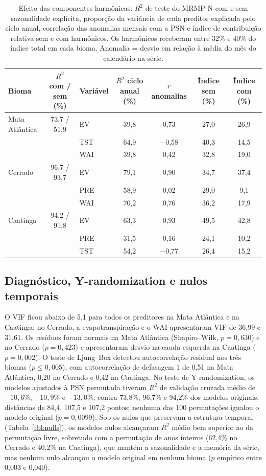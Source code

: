 \documentclass[a4paper,fleqn]{cas-dc}
\begin{document}
\begin{table}[htbp]
\caption{Efeito das componentes harmônicas: $R^2$ de teste do MRMP-N com e sem sazonalidade explícita, proporção da variância de cada preditor explicada pelo ciclo anual, correlação das anomalias mensais com a PSN e índice de contribuição relativa sem e com harmônicos. Os harmônicos receberam entre 32\% e 40\% do índice total em cada bioma. Anomalia = desvio em relação à média do mês do calendário na série.}\label{tbl:harm}
\scriptsize
\begin{tabular*}{\tblwidth}{@{}LCLCCCC@{}}
\toprule
Bioma & $R^2$ com / sem (\%) & Variável & $R^2$ ciclo anual (\%) & $r$ anomalias & Índice sem (\%) & Índice com (\%) \\
\midrule
Mata Atlântica & 73,7 / 51,9 & EV & 39,8 & 0,73 & 27,0 & 26,9 \\
 & & TST & 64,9 & $-$0,58 & 40,3 & 14,5 \\
 & & WAI & 39,8 & 0,42 & 32,8 & 19,0 \\
Cerrado & 96,7 / 93,7 & EV & 79,1 & 0,90 & 34,7 & 37,4 \\
 & & PRE & 58,9 & 0,02 & 29,0 & 9,1 \\
 & & WAI & 70,2 & 0,76 & 36,2 & 17,9 \\
Caatinga & 94,2 / 91,8 & EV & 63,3 & 0,93 & 49,5 & 42,8 \\
 & & PRE & 31,5 & 0,16 & 24,1 & 10,2 \\
 & & TST & 54,2 & $-$0,77 & 26,4 & 15,2 \\
\bottomrule
\end{tabular*}
\end{table}

\subsection{Diagnóstico, Y-randomization e nulos temporais}

O VIF ficou abaixo de 5,1 para todos os preditores na Mata Atlântica e na Caatinga; no Cerrado, a evapotranspiração e o WAI apresentaram VIF de 36,99 e 31,61. Os resíduos foram normais na Mata Atlântica (Shapiro--Wilk, $p = 0,630$) e no Cerrado ($p = 0,423$) e apresentaram desvio na cauda esquerda na Caatinga ($p = 0,002$). O teste de Ljung--Box detectou autocorrelação residual nos três biomas ($p \le 0,005$), com autocorrelação de defasagem 1 de 0,51 na Mata Atlântica, 0,20 no Cerrado e 0,42 na Caatinga. No teste de Y-randomization, os modelos ajustados à PSN permutada tiveram $R^2$ de validação cruzada médio de $-10,6\%$, $-10,9\%$ e $-13,0\%$, contra 73,8\%, 96,7\% e 94,2\% dos modelos originais, distâncias de 84,4, 107,5 e 107,2 pontos; nenhuma das 100 permutações igualou o modelo original ($p = 0,0099$). Sob os nulos que preservam a estrutura temporal (Tabela~\ref{tbl:nulls}), os modelos nulos alcançaram $R^2$ médio bem superior ao da permutação livre, sobretudo com a permutação de anos inteiros (62,4\% no Cerrado e 40,2\% na Caatinga), que mantém a sazonalidade e a memória da série, mas nenhum nulo alcançou o modelo original em nenhum bioma ($p$ empírico entre 0,003 e 0,040).
\end{document}
